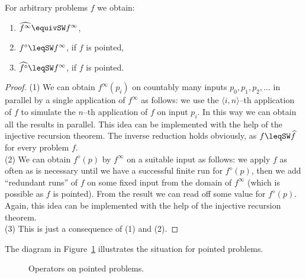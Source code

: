 \begin{prop}
\label{prop:parallelization-diamond}
For arbitrary problems $f$ we obtain:
\begin{enumerate}
\item $\widehat{f^\infty}\equivSW f^\infty$,
\item $f^\diamond\leqSW f^\infty$, if $f$ is pointed,
\item $\widehat{f^\diamond}\leqSW f^\infty$, if $f$ is pointed.
\end{enumerate}
\end{prop}
\begin{proof}
(1) We can obtain $f^\infty(p_i)$ on countably many inputs $p_0,p_1,p_2,...$ in parallel
by a single application of $f^\infty$ as follows: we use the $\langle i,n\rangle$--th application
of $f$ to simulate the $n$--th application of $f$ on input $p_i$. In this way we can
obtain all the results in parallel. This idea can be implemented with the help
of the injective recursion theorem.
The inverse reduction holds obviously, as $f\leqSW\widehat{f}$ for every problem $f$.\\
(2) We can obtain $f^\diamond(p)$ by $f^\infty$ on a suitable input as follows:
we apply $f$ as often as is necessary until we have a successful finite run
for $f^\diamond(p)$, then we add ``redundant runs'' of $f$ on some fixed input
from the domain of $f^\infty$ (which is possible as $f$ is pointed).
From the result we can read off some value for $f^\diamond(p)$. 
Again, this idea can be implemented with the help of the injective recursion theorem.\\
(3) This is just a consequence of (1) and (2).
\end{proof}

\noindent
The diagram in Figure~\ref{fig:operators} illustrates the situation for pointed problems.

\begin{figure}[htb]
\begin{center}
\caption{Operators on pointed problems.}
\label{fig:operators}
\end{center}
\end{figure}

